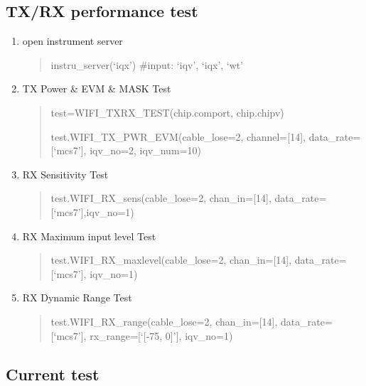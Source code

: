 \documentclass[letterpaper,10pt,english]{sphinxhowto}
\begin{document}
\subsection{TX/RX performance test}
\label{\detokenize{quick_start/quick_start:tx-rx-performance-test}}\begin{enumerate}
\def\theenumi{\arabic{enumi}}
\def\labelenumi{\theenumi .}
\makeatletter\def\p@enumii{\p@enumi \theenumi .}\makeatother
\item {} 
open instrument server
\begin{quote}

instru\_server(‘iqx’)  \#input: ‘iqv’, ‘iqx’, ‘wt’
\end{quote}

\item {} 
TX Power \& EVM \& MASK Test
\begin{quote}

test=WIFI\_TXRX\_TEST(chip.comport, chip.chipv)

test.WIFI\_TX\_PWR\_EVM(cable\_lose=2, channel={[}14{]}, data\_rate={[}‘mcs7’{]}, iqv\_no=2, iqv\_num=10)
\end{quote}

\item {} 
RX Sensitivity Test
\begin{quote}

test.WIFI\_RX\_sens(cable\_lose=2, chan\_in={[}14{]}, data\_rate={[}‘mcs7’{]},iqv\_no=1)
\end{quote}

\item {} 
RX Maximum input level Test
\begin{quote}

test.WIFI\_RX\_maxlevel(cable\_lose=2, chan\_in={[}14{]}, data\_rate={[}‘mcs7’{]}, iqv\_no=1)
\end{quote}

\item {} 
RX Dynamic Range Test
\begin{quote}

test.WIFI\_RX\_range(cable\_lose=2, chan\_in={[}14{]}, data\_rate={[}‘mcs7’{]}, rx\_range={[}‘{[}-75, 0{]}’{]}, iqv\_no=1)
\end{quote}

\end{enumerate}


\subsection{Current test}
\label{\detokenize{quick_start/quick_start:current-test}}
\end{document}
